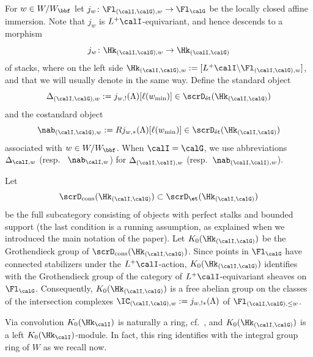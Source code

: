 \documentclass[10pt, reqno]{amsart}
\theoremstyle{plain}
\theoremstyle{definition}
\numberwithin{equation}{section}
\begin{document}
	For $w\in W/W_\bbf$ let $j_w\colon \Fl_{(\calI,\calG),w}\to \Fl_{\calG}$ be the locally closed affine immersion. Note that $j_w$ is $L^+\calI$-equivariant, and hence descends to a morphism
	\begin{equation}\label{sheaf_standard}
		j_w\colon \Hk_{(\calI,\calG),w}\to \Hk_{(\calI,\calG)} 
	\end{equation}
	of stacks, where on the left side $\Hk_{(\calI,\calG),w}:=[L^+\calI\backslash \Fl_{(\calI,\calG),w}]$, and that we will usually denote in the same way.	
	Define the standard object
	\begin{equation}\label{sheaf_standard}
		\Delta_{(\calI,\calG),w}:=j_{w,!}(\Lambda)[\ell(w_{\mathrm{min}})] \in \scrD_{\mathrm{\acute{e}t}}(\Hk_{(\calI,\calG)})
	\end{equation}
	and the costandard object
	\begin{equation}\label{sheaf_costand}
		\nab_{(\calI,\calG),w}:=Rj_{w,\ast}(\Lambda)[\ell(w_{\mathrm{min}})] \in \scrD_{\mathrm{\acute{e}t}}(\Hk_{(\calI,\calG)})
	\end{equation}
	associated with $w\in W/W_\bbf$. When $\calI=\calG$, we use abbreviations $\Delta_{\calI,w}$ (resp.~ $\nab_{\calI,w}$) for $\Delta_{(\calI,\calI),w}$ (resp.~$\nab_{(\calI,\calI),w}$).
	
	Let
	\begin{equation}
		\scrD_{\mathrm{cons}}(\Hk_{(\calI,\calG)})\subset \scrD_{\et}(\Hk_{(\calI,\calG)})
	\end{equation}
	be the full subcategory consisting of objects with perfect stalks and bounded support (the last condition is a running assumption, as explained when we introduced the main notation of the paper).
	Let	$K_0(\Hk_{(\calI,\calG)})$ be the Grothendieck group of $\scrD_{\mathrm{cons}}(\Hk_{(\calI,\calG)})$. Since points in $\Fl_{ \calG}$ have connected stabilizers under the $L^+\calI$-action, $K_0(\Hk_{(\calI,\calG)})$ identifies with the Grothendieck group of the category of $L^+\calI$-equivariant sheaves on $\Fl_{\calG}$.
	Consequently, $K_0(\Hk_{(\calI,\calG)})$ is a free abelian group on the classes of the intersection complexes $\IC_{(\calI,\calG),w}:=j_{w,!\ast}(\Lambda)$ of $\Fl_{(\calI,\calG),\leq w}$.
	
	Via convolution $K_0(\Hk_{\calI})$ is naturally a ring, cf.\ \cite[Section 5.2]{AR}, and $K_0(\Hk_{(\calI,\calG)})$ is a left $K_0(\Hk_{\calI})$-module. In fact, this ring identifies with the integral group ring of $W$ as we recall now.
	
\end{document}
